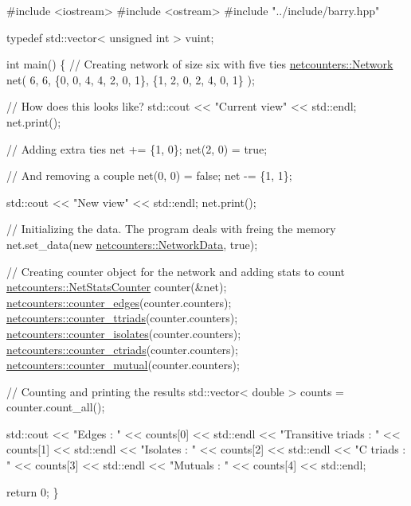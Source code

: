 \begin{DoxyCode}
\textcolor{preprocessor}{#include <iostream>}
\textcolor{preprocessor}{#include <ostream>}
\textcolor{preprocessor}{#include "../include/barry.hpp"}

\textcolor{keyword}{typedef} std::vector< unsigned int > vuint;

\textcolor{keywordtype}{int} main() \{
  \textcolor{comment}{// Creating network of size six with five ties}
  \hyperlink{classbarry_1_1_b_array}{netcounters::Network} net(
      6, 6,
      \{0, 0, 4, 4, 2, 0, 1\},
      \{1, 2, 0, 2, 4, 0, 1\}
  );

  \textcolor{comment}{// How does this looks like?}
  std::cout << \textcolor{stringliteral}{"Current view"} << std::endl;
  net.print();

  \textcolor{comment}{// Adding extra ties}
  net += \{1, 0\};
  net(2, 0) = \textcolor{keyword}{true};

  \textcolor{comment}{// And removing a couple}
  net(0, 0) = \textcolor{keyword}{false};
  net -= \{1, 1\};

  std::cout << \textcolor{stringliteral}{"New view"} << std::endl;  
  net.print();

  \textcolor{comment}{// Initializing the data. The program deals with freing the memory}
  net.set\_data(\textcolor{keyword}{new} \hyperlink{classbarry_1_1counters_1_1network_1_1_network_data}{netcounters::NetworkData}, \textcolor{keyword}{true});

  \textcolor{comment}{// Creating counter object for the network and adding stats to count}
  \hyperlink{classbarry_1_1_stats_counter}{netcounters::NetStatsCounter} counter(&net);
  \hyperlink{network_8hpp_abd98b97f5b4e45972e132051b12891c8}{netcounters::counter\_edges}(counter.counters);
  \hyperlink{network_8hpp_a870a0b3698622948d0bfc668e08752a2}{netcounters::counter\_ttriads}(counter.counters);
  \hyperlink{network_8hpp_ab4c23f807f01c7a9736bb6b9b34820c7}{netcounters::counter\_isolates}(counter.counters);
  \hyperlink{network_8hpp_a8ea4bb27771e3fb61f807f4dff2a6e57}{netcounters::counter\_ctriads}(counter.counters);
  \hyperlink{network_8hpp_a78f7e03b92269082ada763e1a936abf3}{netcounters::counter\_mutual}(counter.counters);

  \textcolor{comment}{// Counting and printing the results}
  std::vector< double > counts = counter.count\_all();

  std::cout <<
    \textcolor{stringliteral}{"Edges             : "} << counts[0] << std::endl <<
    \textcolor{stringliteral}{"Transitive triads : "} << counts[1] << std::endl <<
    \textcolor{stringliteral}{"Isolates          : "} << counts[2] << std::endl <<
    \textcolor{stringliteral}{"C triads          : "} << counts[3] << std::endl <<
    \textcolor{stringliteral}{"Mutuals           : "} << counts[4] << std::endl;

  \textcolor{keywordflow}{return} 0;
\}
\end{DoxyCode}


